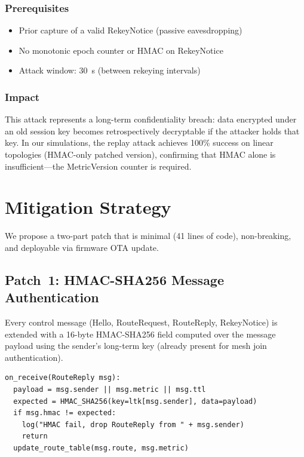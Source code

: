 \documentclass[journal]{IEEEtran}
\begin{document}
\subsubsection{Prerequisites}
\begin{itemize}
  \item Prior capture of a valid RekeyNotice (passive eavesdropping)
  \item No monotonic epoch counter or HMAC on RekeyNotice
  \item Attack window: 30~s (between rekeying intervals)
\end{itemize}

\subsubsection{Impact}
This attack represents a long-term confidentiality breach: data
encrypted under an old session key becomes retrospectively decryptable
if the attacker holds that key. In our simulations, the replay attack
achieves 100\% success on linear topologies (HMAC-only patched
version), confirming that HMAC alone is insufficient—the MetricVersion
counter is required.

\section{Mitigation Strategy}
\label{sec:mitigation}

We propose a two-part patch that is minimal (41 lines of code),
non-breaking, and deployable via firmware OTA update.

\subsection{Patch~1: HMAC-SHA256 Message Authentication}

Every control message (Hello, RouteRequest, RouteReply, RekeyNotice)
is extended with a 16-byte HMAC-SHA256 field computed over the
message payload using the sender's long-term key (already present
for mesh join authentication).

\begin{lstlisting}[caption={HMAC verification pseudocode (route.cpp)}]
on_receive(RouteReply msg):
  payload = msg.sender || msg.metric || msg.ttl
  expected = HMAC_SHA256(key=ltk[msg.sender], data=payload)
  if msg.hmac != expected:
    log("HMAC fail, drop RouteReply from " + msg.sender)
    return
  update_route_table(msg.route, msg.metric)
\end{lstlisting}
\end{document}
